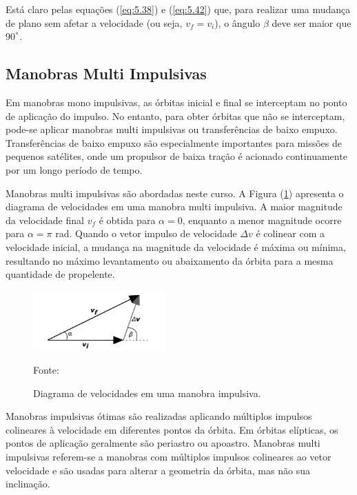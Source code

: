 Está claro pelas equações (\ref{eq:5.38}) e (\ref{eq:5.42}) que, para realizar uma mudança de plano sem afetar a velocidade (ou seja, $v_f = v_i$), o ângulo $\beta$ deve ser maior que 90$^\degree$.

\subsection{Manobras Multi Impulsivas}

\par Em manobras mono impulsivas, as órbitas inicial e final se interceptam no ponto de aplicação do impulso. No entanto, para obter órbitas que não se interceptam, pode-se aplicar manobras multi impulsivas ou transferências de baixo empuxo. Transferências de baixo empuxo são especialmente importantes para missões de pequenos satélites, onde um propulsor de baixa tração é acionado continuamente por um longo período de tempo.

\par Manobras multi impulsivas são abordadas neste curso. A Figura (\ref{fig:diagramavelo}) apresenta o diagrama de velocidades em uma manobra multi impulsiva. A maior magnitude da velocidade final $v_f$ é obtida para $\alpha = 0$, enquanto a menor magnitude ocorre para $\alpha = \pi$ rad. Quando o vetor impulso de velocidade $\Delta v$ é colinear com a velocidade inicial, a mudança na magnitude da velocidade é máxima ou mínima, resultando no máximo levantamento ou abaixamento da órbita para a mesma quantidade de propelente.

\begin{figure}[h]
        \centering
        \includegraphics[width=2in]{figuras/diagramaveloci.png}
        \caption{Diagrama de velocidades em uma manobra impulsiva.}
        \footnotesize Fonte: \cite{livro:andre}
        \label{fig:diagramavelo}
\end{figure} 

\par Manobras impulsivas ótimas são realizadas aplicando múltiplos impulsos colineares à velocidade em diferentes pontos da órbita. Em órbitas elípticas, os pontos de aplicação geralmente são periastro ou apoastro. Manobras multi impulsivas referem-se a manobras com múltiplos impulsos colineares ao vetor velocidade e são usadas para alterar a geometria da órbita, mas não sua inclinação.

